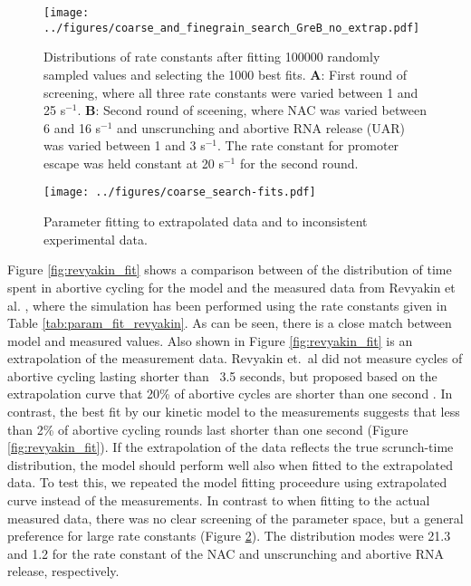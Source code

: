 \begin{figure}
	\begin{center}
      \texttt{[image: ../figures/coarse\_and\_finegrain\_search\_GreB\_no\_extrap.pdf]}
	\end{center}
    \caption{Distributions of rate constants after fitting 100000 randomly
      sampled values and selecting the 1000 best fits. \textbf{A}: First round
      of screening, where all three rate constants were varied between 1 and
      25 s$^{-1}$. \textbf{B}: Second round of sceening, where NAC was varied
      between 6 and 16 s$^{-1}$ and unscrunching and abortive RNA release
      (UAR) was varied between 1 and 3 s$^{-1}$. The rate constant for
      promoter escape was held constant at 20 s$^{-1}$ for the second round.}
      \label{fig:parameter_estimation_proper}
\end{figure}

\begin{figure}
	\begin{center}
      \texttt{[image: ../figures/coarse\_search-fits.pdf]}
	\end{center}
    \caption{Parameter fitting to extrapolated data and to inconsistent
      experimental data.}
      \label{fig:extrap_and_GreB_minus_fit}
\end{figure}

Figure \ref{fig:revyakin_fit} shows a comparison between of the distribution
of time spent in abortive cycling for the model and the measured data from
Revyakin et al. \cite{revyakin_abortive_2006}, where the simulation has been
performed using the rate constants given in Table
\ref{tab:param_fit_revyakin}. As can be seen, there is a close match between
model and measured values. Also shown in Figure \ref{fig:revyakin_fit} is an
extrapolation of the measurement data. Revyakin et.\ al did not measure cycles
of abortive cycling lasting shorter than ~3.5 seconds, but proposed based on
the extrapolation curve that 20\% of abortive cycles are shorter than one
second \cite{revyakin_abortive_2006}. In contrast, the best fit by our kinetic
model to the measurements suggests that less than 2\% of abortive cycling
rounds last shorter than one second (Figure \ref{fig:revyakin_fit}). If the
extrapolation of the data reflects the true scrunch-time distribution, the
model should perform well also when fitted to the extrapolated data. To test
this, we repeated the model fitting proceedure using extrapolated curve
instead of the measurements. In contrast to when fitting to the actual
measured data, there was no clear screening of the parameter space, but a
general preference for large rate constants (Figure
\ref{fig:extrap_and_GreB_minus_fit}). The distribution modes were 21.3 and 1.2
for the rate constant of the NAC and unscrunching and abortive RNA release,
respectively.

